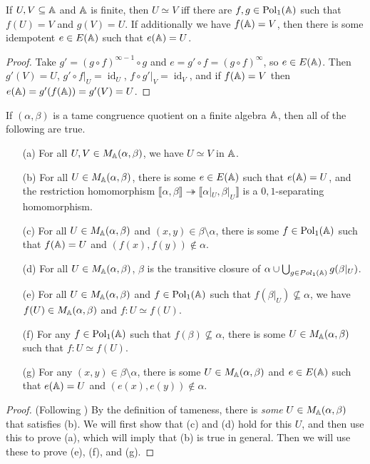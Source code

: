 \begin{appendices}
\begin{prop} If $U,V \subseteq \mathbb{A}$ and $\mathbb{A}$ is finite, then $U \simeq V$ iff there are $f, g \in \operatorname{Pol}_1(\mathbb{A})$ such that $f(U) = V$ and $g(V) = U$. If additionally we have $f(\mathbb{A}) = V$, then there is some idempotent $e \in E(\mathbb{A})$ such that $e(\mathbb{A}) = U$.
\end{prop}
\begin{proof} Take $g' = (g \circ f)^{\infty - 1}\circ g$ and $e = g' \circ f = (g \circ f)^{\infty}$, so $e \in E(\mathbb{A})$. Then $g'(V) = U$, $g'\circ f|_U = \operatorname{id}_U$, $f\circ g'|_V = \operatorname{id}_V$, and if $f(\mathbb{A}) = V$ then $e(\mathbb{A}) = g'(f(\mathbb{A})) = g'(V) = U$.
\end{proof}

\begin{thm}\label{thm-minimal-sets} If $(\alpha,\beta)$ is a tame congruence quotient on a finite algebra $\mathbb{A}$, then all of the following are true.
\begin{itemize}
\item[(a)] For all $U,V \in M_{\mathbb{A}}(\alpha,\beta)$, we have $U \simeq V$ in $\mathbb{A}$.

\item[(b)] For all $U \in M_{\mathbb{A}}(\alpha,\beta)$, there is some $e \in E(\mathbb{A})$ such that $e(\mathbb{A}) = U$, and the restriction homomorphism $\llbracket \alpha, \beta \rrbracket \twoheadrightarrow \llbracket \alpha|_U, \beta|_U \rrbracket$ is a $0,1$-separating homomorphism.

\item[(c)] For all $U \in M_{\mathbb{A}}(\alpha, \beta)$ and $(x,y) \in \beta\setminus\alpha$, there is some $f \in \operatorname{Pol}_1(\mathbb{A})$ such that $f(\mathbb{A}) = U$ and $(f(x),f(y)) \not\in \alpha$.

\item[(d)] For all $U \in M_{\mathbb{A}}(\alpha, \beta)$, $\beta$ is the transitive closure of $\alpha \cup \bigcup_{g \in Pol_1(\mathbb{A})} g(\beta|_U)$.

\item[(e)] For all $U \in M_{\mathbb{A}}(\alpha, \beta)$ and $f \in \operatorname{Pol}_1(\mathbb{A})$ such that $f(\beta|_U) \not\subseteq \alpha$, we have $f(U) \in M_{\mathbb{A}}(\alpha, \beta)$ and $f : U \simeq f(U)$.

\item[(f)] For any $f \in \operatorname{Pol}_1(\mathbb{A})$ such that $f(\beta) \not\subseteq \alpha$, there is some $U \in M_{\mathbb{A}}(\alpha,\beta)$ such that $f : U \simeq f(U)$.

\item[(g)] For any $(x,y) \in \beta\setminus\alpha$, there is some $U \in M_{\mathbb{A}}(\alpha, \beta)$ and $e \in E(\mathbb{A})$ such that $e(\mathbb{A}) = U$ and $(e(x), e(y)) \not\in \alpha$.
\end{itemize}
\end{thm}
\begin{proof} (Following \cite{hobby-mckenzie}) By the definition of tameness, there is \emph{some} $U \in M_{\mathbb{A}}(\alpha, \beta)$ that satisfies (b). We will first show that (c) and (d) hold for this $U$, and then use this to prove (a), which will imply that (b) is true in general. Then we will use these to prove (e), (f), and (g).


\end{proof}
\end{appendices}

